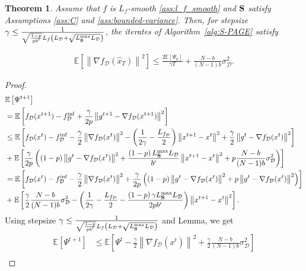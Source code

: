 \documentclass{article}
\newtheorem{theorem}{Theorem}
\theoremstyle{plain}
\newcommand{\tf}{f_{\mathcal{D}}}
\newcommand{\mS}{{\bf S}}
\theoremstyle{plain}
\theoremstyle{definition}
\theoremstyle{remark}
\begin{document}
\begin{theorem}
Assume that $f$ is $L_f$-smooth \eqref{ass:l_f_smooth} and $\mS$ satisfy Assumptions \ref{ass:C} and \ref{ass:bounded-variance}.
    Then, for stepsize $\gamma \leq \frac{1}{\sqrt{\frac{1-p}{p b^\prime}}L_f\left( L_{\mathcal{D}}+\sqrt{L^{\max}_{\mS}L_{\mathcal{D}}}\right)}$, the iterates of Algorithm~\ref{alg:S-PAGE} satisfy

       \begin{align*}
       \mathbb{E}\left[\left\|\nabla \tf\left(\widehat{x}_T\right)\right\|^2\right] \leq \frac{2 \mathbb{E}\left[\Psi_0\right]}{\gamma T} +  \frac{N-b}{(N-1)b}\sigma^2_{\mathcal{D}}.
   \end{align*}
\end{theorem}
\begin{proof}
    \begin{align*}
     &\mathbb{E}\left[\Psi^{t+1}\right]\\ &=    \mathbb{E}\left[\tf(x^{t+1})-f^{\inf}_{\mathcal{D}}+\frac{\gamma}{2 p}\left\|g^{t+1}-\nabla \tf(x^{t+1})\right\|^2\right] \\
     &\leq \mathbb{E}\left[\tf(x^t) - \tf^{\inf}-\frac{\gamma}{2}\left\|\nabla  \tf(x^t)\right\|^2-\left(\frac{1}{2 \gamma}-\frac{L_{\tf}}{2}\right)\left\|x^{t+1}-x^t\right\|^2+\frac{\gamma}{2}\left\|g^t-\nabla  \tf (x^t)\right\|^2\right]\\
     &+\mathbb{E}\left[\frac{\gamma}{2p} \left( \left(1-p\right)\left\|g^t-\nabla \tf(x^t)\right\|^2+\frac{\left(1-p\right) L^{\max}_{\mS} L_{\mathcal{D}}}{b^{\prime}}\left\|x^{t+1}-x^t\right\|^2+ p\frac{N-b}{(N-1)b} \sigma^2_{\mathcal{D}}  \right)\right]\\
     & = \mathbb{E} \left[ \tf(x^t) - \tf^{\inf} -\frac{\gamma}{2}\left\|\nabla  \tf(x^t)\right\|^2 + \frac{\gamma}{2p}\left( \left(1-p\right)\left\|g^t-\nabla \tf(x^t)\right\|^2 + p \left\|g^t-\nabla \tf(x^t)\right\|^2 \right)\right]\\
     &+\mathbb{E}\left[  \frac{\gamma}{2}\frac{N-b}{(N-1)b} \sigma^2_{\mathcal{D}} - \left( \frac{1}{2 \gamma}-\frac{L_{\tf}}{2} - \frac{\left(1-p\right) \gamma L^{\max}_{\mS} L_{\mathcal{D}}}{2pb^{\prime}} \right)\left\|x^{t+1}-x^t\right\|^2\right].
    \end{align*}
Using stepsize $\gamma\leq \frac{1}{\sqrt{\frac{1-p}{p b^\prime}}L_f\left( L_{\mathcal{D}}+\sqrt{L^{\max}_{\mS}L_{\mathcal{D}}}\right)}$ and Lemma, we get
    \begin{align}
     \mathbb{E}\left[\Psi^{t+1}\right] & \leq \mathbb{E}\left[ \Psi^t - \frac{\gamma}{2}\left\|\nabla  \tf(x^t)\right\|^2 + \frac{\gamma}{2}\frac{N-b}{(N-1)b} \sigma^2_{\mathcal{D}} \right]\\

\end{align}
\end{proof}
\end{document}
